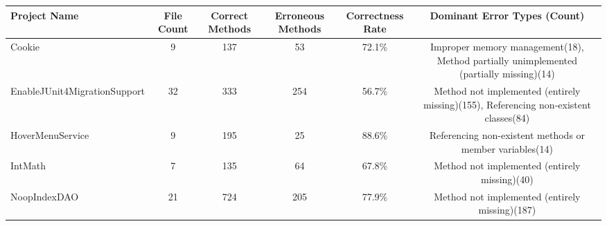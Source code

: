 \begin{table}[H]
  \centering
  \begin{tabular}{lccccc}
    \hline
    Project Name & File Count & Correct Methods & Erroneous Methods & Correctness Rate &  Dominant Error Types (Count) \\
    \hline
    Cookie & 9 & 137 & 53 & 72.1\% & Improper memory management(18), Method partially unimplemented (partially missing)(14) \\
    EnableJUnit4MigrationSupport & 32 & 333 & 254 & 56.7\% & Method not implemented (entirely missing)(155), Referencing non-existent classes(84) \\
    HoverMenuService & 9 & 195 & 25 & 88.6\% & Referencing non-existent methods or member variables(14) \\
    IntMath & 7 & 135 & 64 & 67.8\% & Method not implemented (entirely missing)(40) \\
    NoopIndexDAO & 21 & 724 & 205 & 77.9\% & Method not implemented (entirely missing)(187) \\
    \hline
  \end{tabular}
\end{table}

